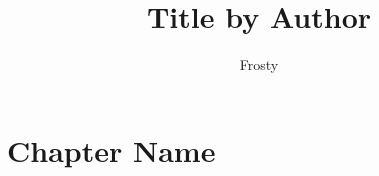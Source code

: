 \documentclass[10pt]{article}  %
\title{Title by Author}
\author{Frosty}
\begin{document}
\maketitle

\tableofcontents

\section{Chapter Name}

\end{document}
